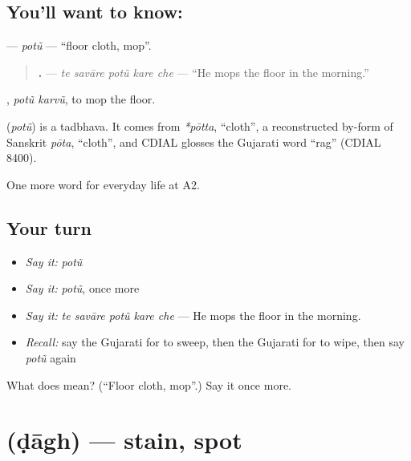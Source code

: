\subsection*{You'll want to know: }
\textbf{} — \emph{potũ} — \textquotedblleft{}floor cloth, mop\textquotedblright{}.

\begin{quote}
\textbf{    .} — \emph{te savāre potũ kare che} — \textquotedblleft{}He mops the floor in the morning.\textquotedblright{}
\end{quote}

\textbf{ }, \emph{potũ karvũ}, to mop the floor.

\begin{cousinweb}
\textbf{} (\emph{potũ}) is a tadbhava. It comes from \emph{*pōtta}, \textquotedblleft{}cloth\textquotedblright{}, a reconstructed by-form of Sanskrit \emph{pōta}, \textquotedblleft{}cloth\textquotedblright{}, and CDIAL glosses the Gujarati word \textquotedblleft{}rag\textquotedblright{} (CDIAL 8400).
\end{cousinweb}

\begin{grammarlens}[title={What you've built}]
One more word for everyday life at A2.
\end{grammarlens}

\subsection*{Your turn}
\begin{itemize}
\raggedright
  \item \emph{Say it:} \emph{potũ}
  \item \emph{Say it:} \emph{potũ}, once more
  \item \emph{Say it:} \emph{te savāre potũ kare che} — He mops the floor in the morning.
  \item \emph{Recall:} say the Gujarati for to sweep, then the Gujarati for to wipe, then say \emph{potũ} again
\end{itemize}

\begin{tcolorbox}[breakable,colback=teal!4,colframe=teal!35!black,title={Before you move on}]
What does  mean? (\textquotedblleft{}Floor cloth, mop\textquotedblright{}.) Say it once more.
\end{tcolorbox}
\section[\texorpdfstring{\gu{ડાઘ} (ḍāgh)}{ડાઘ (ḍāgh)}]{ (ḍāgh) — stain, spot}

